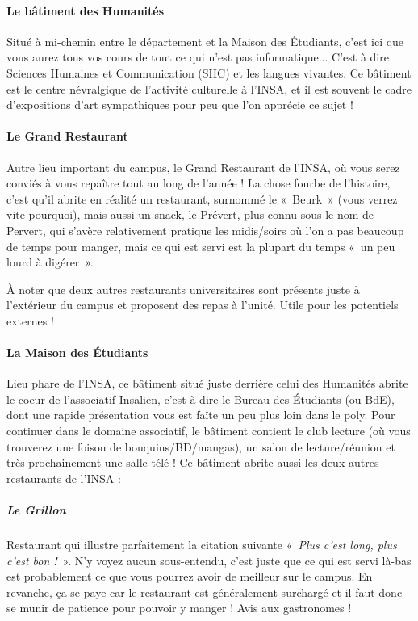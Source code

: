 \paragraph{Le bâtiment des Humanités}
Situé à mi-chemin entre le département et la Maison des Étudiants, c'est ici
que vous aurez tous vos cours de tout ce qui n'est pas informatique... C'est à
dire Sciences Humaines et Communication (SHC) et les langues vivantes. 
Ce bâtiment est le centre névralgique de l'activité culturelle à l'INSA, et il
est souvent le cadre d'expositions d'art sympathiques pour peu que l'on apprécie ce sujet !

\paragraph{Le Grand Restaurant}
Autre lieu important du campus, le Grand Restaurant de l'INSA, où vous
serez conviés à vous repaître tout au long de l'année ! La chose fourbe de l'histoire, c'est qu'il abrite en réalité un restaurant, surnommé le «~Beurk~» (vous verrez vite pourquoi), mais aussi
un snack, le Prévert, plus connu sous le nom de Pervert, qui s'avère
relativement pratique les midis/soirs où l'on a pas beaucoup de temps pour manger, mais ce
qui est servi est la plupart du temps «~un peu lourd à digérer~».

\vspace{1em}

À noter que deux autres restaurants universitaires sont présents juste à l'extérieur du campus et proposent des repas à l'unité. Utile pour les potentiels externes !

\paragraph{La Maison des Étudiants}
Lieu phare de l'INSA, ce bâtiment situé juste derrière celui des Humanités
abrite le coeur de l'associatif Insalien, c'est à dire le Bureau des Étudiants (ou
BdE), dont une rapide présentation vous est faîte un peu plus loin dans le
poly. Pour continuer dans le domaine associatif, le bâtiment contient le
club lecture (où vous trouverez une foison de bouquins/BD/mangas), un salon de
lecture/réunion et très prochainement une salle télé !
Ce bâtiment abrite aussi les deux autres restaurants de l'INSA :

\subparagraph{Le Grillon}
Restaurant qui illustre parfaitement la citation suivante «~\emph{Plus c'est long,
	   plus c'est bon !}~». N'y voyez aucun sous-entendu, c'est juste que ce qui est servi là-bas est probablement
ce que vous pourrez avoir de meilleur sur le campus. En revanche, ça se paye car le restaurant 
est généralement surchargé et il faut donc se munir de patience pour pouvoir y manger ! Avis aux gastronomes !

